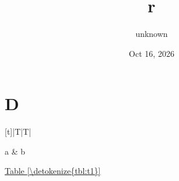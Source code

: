 \documentclass[letterpaper,10pt,english]{sphinxmanual}
\title{r}
\date{Oct 16, 2026}
\author{unknown}
\begin{document}
\pagestyle{empty}
\sphinxmaketitle
\pagestyle{plain}
\sphinxtableofcontents
\pagestyle{normal}
\label{\detokenize{index::doc}}



\chapter{D}
\label{\detokenize{tbl:d}}\label{\detokenize{tbl::doc}}

\begin{savenotes}\sphinxattablestart
\centering
{}
\sphinxthecaptionisattop
{}\label{\detokenize{tbl:t1}}
\sphinxaftertopcaption
\begin{tabulary}{\linewidth}[t]{|T|T|}
\hline

a
&
b
\\
\hline
\end{tabulary}
\par
\sphinxattableend\end{savenotes}

\hyperref[\detokenize{tbl:t1}]{Table \ref{\detokenize{tbl:t1}}}



\renewcommand{\indexname}{Index}
\printindex
\end{document}
